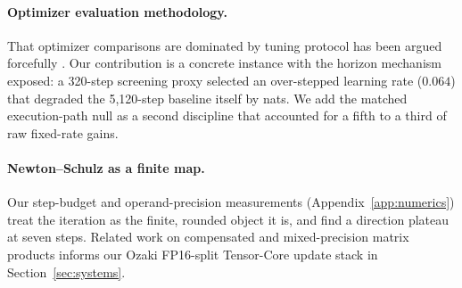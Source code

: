 \paragraph{Optimizer evaluation methodology.}
That optimizer comparisons are dominated by tuning protocol has been argued
forcefully \citep{schmidt2021crowded,choi2019empirical,kaddour2023nodata}. Our
contribution is a concrete instance with the horizon mechanism exposed: a
320-step screening proxy selected an over-stepped learning rate ($0.064$) that
degraded the 5{,}120-step baseline itself by \waveTwelveMuontSelDiffMag{} nats.
We add the matched execution-path null as a second discipline that accounted for
a fifth to a third of raw fixed-rate gains.

\paragraph{Newton--Schulz as a finite map.}
Our step-budget and operand-precision measurements (Appendix~\ref{app:numerics})
treat the iteration as the finite, rounded object it is, and find a direction
plateau at seven steps. Related work on compensated and mixed-precision matrix
products \citep{henry2019leveraging} informs our Ozaki FP16-split Tensor-Core
update stack in Section~\ref{sec:systems}.
